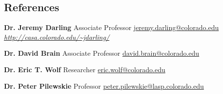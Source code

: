 \documentclass[10pt]{article} %
\begin{document}
\begin{paracol}{2}
\section{References}
\begin{minipage}{\textwidth}
    \position{}{}
    {\textbf{Dr. Jeremy Darling}}
    {{Associate Professor}}
    {\href{mailto:jeremy.darling@colorado.edu}{jeremy.darling@colorado.edu}}
    {\href{http://casa.colorado.edu/~jdarling/}{\textit{http://casa.colorado.edu/\textasciitilde jdarling/}}}
    \vspace{3ex}
\end{minipage}

\begin{minipage}{\textwidth}
    \position{}{}
    {\textbf{Dr. David Brain}}
    {Associate Professor}
    {\href{mailto:david.brain@colorado.edu}{david.brain@colorado.edu}}
    \vspace{3ex}
\end{minipage}
\begin{minipage}{\textwidth}
    \position{}{}
    {\textbf{Dr. Eric T. Wolf}}
    {Researcher}
    {\href{mailto:eric.wolf@colorado.edu}{eric.wolf@colorado.edu}}
    \vspace{3ex}
\end{minipage}
\begin{minipage}{\textwidth}
    \position{}{}
    {\textbf{Dr. Peter Pilewskie}}
    {Professor}
    {\href{mailto:peter.pilewskie@lasp.colorado.edu}
    {peter.pilewskie@lasp.colorado.edu}}
    \vspace{3ex}
\end{minipage}


\end{paracol}

\end{document}
